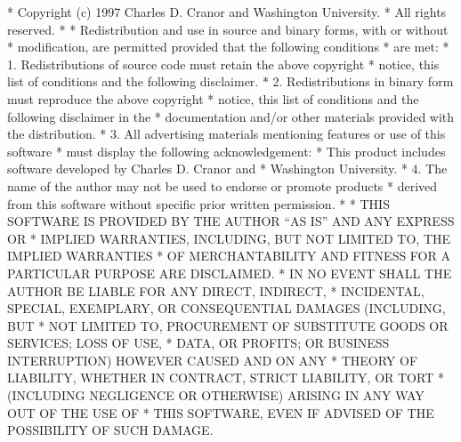 \begin{copyrightEnv}
 * Copyright (c) 1997 Charles D. Cranor and Washington University.
 * All rights reserved.
 *
 * Redistribution and use in source and binary forms, with or without
 * modification, are permitted provided that the following conditions
 * are met:
 * 1. Redistributions of source code must retain the above copyright
 *    notice, this list of conditions and the following disclaimer.
 * 2. Redistributions in binary form must reproduce the above copyright
 *    notice, this list of conditions and the following disclaimer in the
 *    documentation and/or other materials provided with the distribution.
 * 3. All advertising materials mentioning features or use of this software
 *    must display the following acknowledgement:
 *      This product includes software developed by Charles D. Cranor and
 *      Washington University.
 * 4. The name of the author may not be used to endorse or promote products
 *    derived from this software without specific prior written permission.
 *
 * THIS SOFTWARE IS PROVIDED BY THE AUTHOR ``AS IS'' AND ANY EXPRESS OR
 * IMPLIED WARRANTIES, INCLUDING, BUT NOT LIMITED TO, THE IMPLIED WARRANTIES
 * OF MERCHANTABILITY AND FITNESS FOR A PARTICULAR PURPOSE ARE DISCLAIMED.
 * IN NO EVENT SHALL THE AUTHOR BE LIABLE FOR ANY DIRECT, INDIRECT,
 * INCIDENTAL, SPECIAL, EXEMPLARY, OR CONSEQUENTIAL DAMAGES (INCLUDING, BUT
 * NOT LIMITED TO, PROCUREMENT OF SUBSTITUTE GOODS OR SERVICES; LOSS OF USE,
 * DATA, OR PROFITS; OR BUSINESS INTERRUPTION) HOWEVER CAUSED AND ON ANY
 * THEORY OF LIABILITY, WHETHER IN CONTRACT, STRICT LIABILITY, OR TORT
 * (INCLUDING NEGLIGENCE OR OTHERWISE) ARISING IN ANY WAY OUT OF THE USE OF
 * THIS SOFTWARE, EVEN IF ADVISED OF THE POSSIBILITY OF SUCH DAMAGE.
\end{copyrightEnv}

